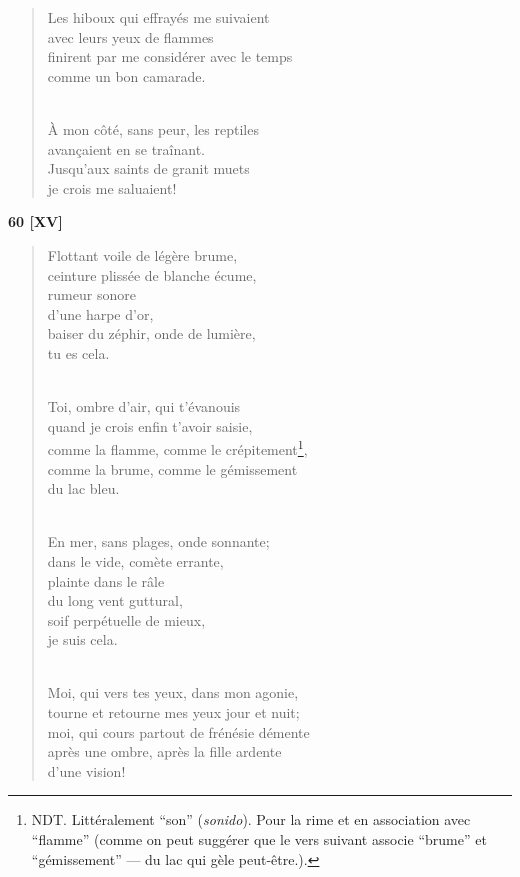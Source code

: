 \documentclass[a4paper,11pt]{book}
\begin{document}
\begin{verse}
Les hiboux qui effrayés me suivaient \\
avec leurs yeux de flammes \\
finirent par me considérer avec le temps \\
comme un bon camarade. \\ \

À mon côté, sans peur, les reptiles \\
avan\c{c}aient en se traînant. \\
Jusqu'aux saints de granit muets \\
je crois me saluaient! \\
\end{verse}

\bigskip

\begin{center} {\bf 60 [XV]} \end{center}

\begin{verse}
Flottant voile de légère brume, \\
ceinture plissée de blanche écume, \\
rumeur sonore \\
d'une harpe d'or, \\
baiser du zéphir, onde de lumière, \\
tu es cela. \\ \

Toi, ombre d'air, qui t'évanouis \\
quand je crois enfin t'avoir saisie, \\
comme la flamme, comme le crépitement\footnote{NDT. Littéralement ``son'' ({\em sonido}). Pour la rime et en association avec ``flamme'' (comme on peut suggérer que le vers suivant associe ``brume'' et ``gémissement'' --- du lac qui gèle peut-être.).}, \\
comme la brume, comme le gémissement \\
du lac bleu. \\ \

En mer, sans plages, onde sonnante; \\
dans le vide, comète errante, \\
plainte dans le râle \\
du long vent guttural, \\
soif perpétuelle de mieux, \\
je suis cela. \\ \

Moi, qui vers tes yeux, dans mon agonie, \\
tourne et retourne mes yeux jour et nuit; \\
moi, qui cours partout de frénésie démente \\
après une ombre, après la fille ardente \\
d'une vision! \\
\end{verse}
\end{document}
